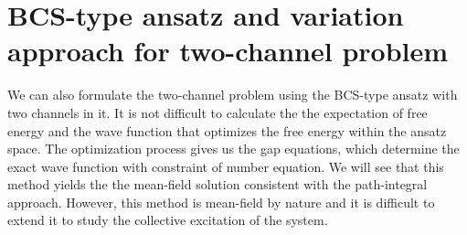 \chapter{BCS-type ansatz and variation approach for two-channel problem \label{ch:mean}}
We can also formulate the two-channel problem  using the  BCS-type ansatz with two channels in it.  It is not difficult to calculate the the expectation of free energy and  the wave function that optimizes the free energy within the ansatz space.  The optimization process gives us the gap equations, which determine the exact wave function with constraint of number equation.   %
We will see that this method yields the the mean-field solution consistent with the path-integral approach.  However, this method is mean-field by nature and it is difficult  to extend it to study the collective excitation of the system.  

